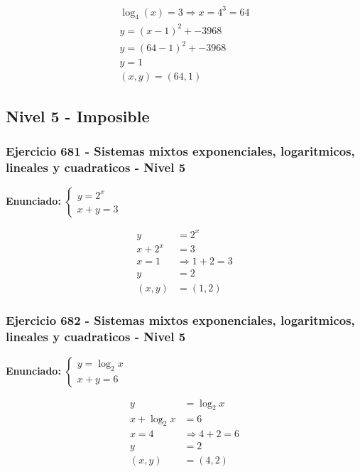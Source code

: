 \documentclass[12pt,a4paper]{article}
\begin{document}
\[
\begin{aligned}
\log_{4}\left(x\right)=3\Rightarrow x=4^{3}=64\\
y=(x-1)^2+-3968\\
y=(64-1)^2+-3968\\
y=1\\
\boxed{(x,y)=(64,1)}
\end{aligned}
\]


\newpage

\subsection*{Nivel 5 - Imposible}

\subsubsection*{Ejercicio 681 - Sistemas mixtos exponenciales, logaritmicos, lineales y cuadraticos - Nivel 5}
\textbf{Enunciado:} \(\begin{cases}y=2^x\\ x+y=3\end{cases}\)

\[
\begin{aligned}
y&=2^x\\
x+2^x&=3\\
x=1&\Rightarrow 1+2=3\\
y&=2\\
(x,y)&=\boxed{(1,2)}
\end{aligned}
\]


\subsubsection*{Ejercicio 682 - Sistemas mixtos exponenciales, logaritmicos, lineales y cuadraticos - Nivel 5}
\textbf{Enunciado:} \(\begin{cases}y=\log_2x\\ x+y=6\end{cases}\)

\[
\begin{aligned}
y&=\log_2x\\
x+\log_2x&=6\\
x=4&\Rightarrow 4+2=6\\
y&=2\\
(x,y)&=\boxed{(4,2)}
\end{aligned}
\]
\end{document}
